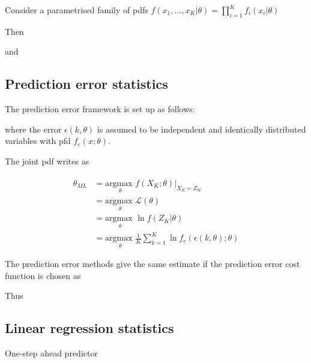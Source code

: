 \documentclass[10pt,a4paper]{scrartcl}
\begin{document}
\begin{multicols*}{2}
Consider a parametrised family of pdfs $f(x_1,\ldots,x_K|\theta)=\prod\limits_{i=1}^Kf_i(x_i|\theta)$

Then


and 


\subsection{Prediction error statistics}

The prediction error framework is set up as follows:


where the error $\epsilon(k,\theta)$ is assumed to be independent and identically distributed variables with pfd $f_e(x;\theta)$.

The joint pdf writes as


\newcommand{\targmax}{\underset{\theta}{\text{argmax }}}
\begin{align*}
\hat{\theta}_{ML}&=\targmax f(X_K;\theta)|_{X_K=Z_K}\\
&=\targmax \mathcal{L}(\theta)\\
&=\targmax \ln f(Z_K|\theta)\\
&=\targmax\frac{1}{K}\sum\limits_{k=1}^K\ln f_e(\epsilon(k,\theta);\theta)
\end{align*}

The prediction error methods give the same estimate if the prediction error cost function is chosen as


Thus


\subsection{Linear regression statistics}

One-step ahead predictor


\end{multicols*}
\end{document}
